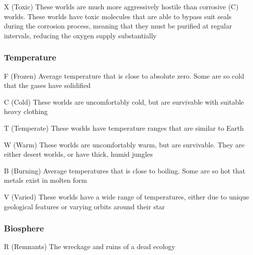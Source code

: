 \begin{genericsection}{X (Toxic)}
  These worlds are much more aggressively hostile than corrosive (C) worlds. These worlds have toxic molecules that are able to bypass suit seals during the corrosion process, meaning that they must be purified at regular intervals, reducing the oxygen supply substantially
\end{genericsection}

\subsubsection{Temperature}

\begin{genericsection}{F (Frozen)}
  Average temperature that is close to absolute zero. Some are so cold that the gases have solidified
\end{genericsection}

\begin{genericsection}{C (Cold)}
  These worlds are uncomfortably cold, but are survivable with suitable heavy clothing
\end{genericsection}

\begin{genericsection}{T (Temperate)}
  These worlds have temperature ranges that are similar to Earth
\end{genericsection}

\begin{genericsection}{W (Warm)}
  These worlds are uncomfortably warm, but are survivable. They are either desert worlds, or have thick, humid jungles
\end{genericsection}

\begin{genericsection}{B (Burning)}
  Average temperatures that is close to boiling. Some are so hot that metals exist in molten form
\end{genericsection}

\begin{genericsection}{V (Varied)}
  These worlds have a wide range of temperatures, either due to unique geological features or varying orbits around their star
\end{genericsection}

\subsubsection{Biosphere}

\begin{genericsection}{R (Remnants)}
  The wreckage and ruins of a dead ecology
\end{genericsection}

